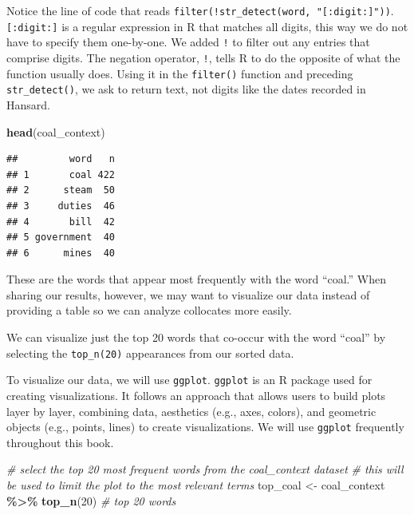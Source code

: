 \documentclass[
]{article}
\newenvironment{Shaded}{\begin{snugshade}}{\end{snugshade}}
\newcommand{\CommentTok}[1]{\textcolor[rgb]{0.56,0.35,0.01}{\textit{#1}}}
\newcommand{\DecValTok}[1]{\textcolor[rgb]{0.00,0.00,0.81}{#1}}
\newcommand{\FunctionTok}[1]{\textcolor[rgb]{0.13,0.29,0.53}{\textbf{#1}}}
\newcommand{\NormalTok}[1]{#1}
\newcommand{\OtherTok}[1]{\textcolor[rgb]{0.56,0.35,0.01}{#1}}
\newcommand{\SpecialCharTok}[1]{\textcolor[rgb]{0.81,0.36,0.00}{\textbf{#1}}}
\begin{document}
Notice the line of code that reads
\texttt{filter(!str\_detect(word,\ "{[}:digit:{]}"))}.
\texttt{{[}:digit:{]}} is a regular expression in R that matches all
digits, this way we do not have to specify them one-by-one. We added
\texttt{!} to filter out any entries that comprise digits. The negation
operator, \texttt{!}, tells R to do the opposite of what the function
usually does. Using it in the \texttt{filter()} function and preceding
\texttt{str\_detect()}, we ask to return text, not digits like the dates
recorded in Hansard.

\begin{Shaded}
\begin{Highlighting}[]
\FunctionTok{head}\NormalTok{(coal\_context)}
\end{Highlighting}
\end{Shaded}

\begin{verbatim}
##         word   n
## 1       coal 422
## 2      steam  50
## 3     duties  46
## 4       bill  42
## 5 government  40
## 6      mines  40
\end{verbatim}

These are the words that appear most frequently with the word ``coal.''
When sharing our results, however, we may want to visualize our data
instead of providing a table so we can analyze collocates more easily.

We can visualize just the top 20 words that co-occur with the word
``coal'' by selecting the \texttt{top\_n(20)} appearances from our
sorted data.

To visualize our data, we will use \texttt{ggplot}. \texttt{ggplot} is
an R package used for creating visualizations. It follows an approach
that allows users to build plots layer by layer, combining data,
aesthetics (e.g., axes, colors), and geometric objects (e.g., points,
lines) to create visualizations. We will use \texttt{ggplot} frequently
throughout this book.

\begin{Shaded}
\begin{Highlighting}[]
\CommentTok{\# select the top 20 most frequent words from the \textquotesingle{}coal\_context\textquotesingle{} dataset}
\CommentTok{\# this will be used to limit the plot to the most relevant terms}
\NormalTok{top\_coal }\OtherTok{\textless{}{-}}\NormalTok{ coal\_context }\SpecialCharTok{\%\textgreater{}\%}
  \FunctionTok{top\_n}\NormalTok{(}\DecValTok{20}\NormalTok{)  }\CommentTok{\# top 20 words}
\end{Highlighting}
\end{Shaded}
\end{document}
